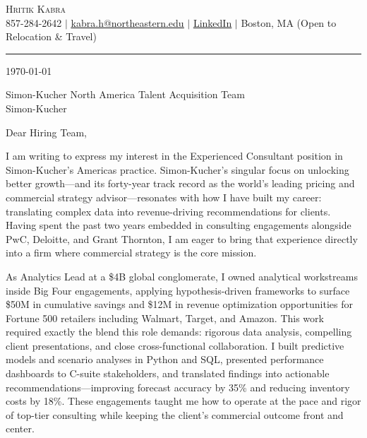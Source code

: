 \documentclass[letterpaper,11pt]{article}
\begin{document}
\begin{center}
    {\LARGE \scshape \color{heading} Hritik Kabra} \\ \vspace{2pt}
    \small 857-284-2642 $|$ \href{mailto:kabra.h@northeastern.edu}{\underline{kabra.h@northeastern.edu}} $|$
    \href{https://www.linkedin.com/in/hritikkabra888}{\underline{LinkedIn}} $|$ Boston, MA (Open to Relocation \& Travel)
\end{center}

\vspace{4pt}
{\color{heading}\hrule}
\vspace{14pt}

\today

\vspace{6pt}

Simon-Kucher North America Talent Acquisition Team\\
Simon-Kucher

\vspace{6pt}

Dear Hiring Team,

I am writing to express my interest in the Experienced Consultant position in Simon-Kucher's Americas practice. Simon-Kucher's singular focus on unlocking better growth---and its forty-year track record as the world's leading pricing and commercial strategy advisor---resonates with how I have built my career: translating complex data into revenue-driving recommendations for clients. Having spent the past two years embedded in consulting engagements alongside PwC, Deloitte, and Grant Thornton, I am eager to bring that experience directly into a firm where commercial strategy is the core mission.

As Analytics Lead at a \$4B global conglomerate, I owned analytical workstreams inside Big Four engagements, applying hypothesis-driven frameworks to surface \$50M in cumulative savings and \$12M in revenue optimization opportunities for Fortune 500 retailers including Walmart, Target, and Amazon. This work required exactly the blend this role demands: rigorous data analysis, compelling client presentations, and close cross-functional collaboration. I built predictive models and scenario analyses in Python and SQL, presented performance dashboards to C-suite stakeholders, and translated findings into actionable recommendations---improving forecast accuracy by 35\% and reducing inventory costs by 18\%. These engagements taught me how to operate at the pace and rigor of top-tier consulting while keeping the client's commercial outcome front and center.
\end{document}

